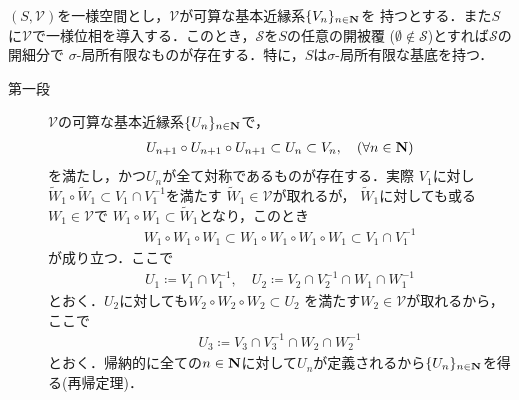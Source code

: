 	\begin{screen}
		\begin{thm}
		\label{thm:if_uniformity_has_countable_base_then_has_topology_has_sigma_locally_finite_base}
			$(S,\mathscr{V})$を一様空間とし，$\mathscr{V}$が可算な基本近縁系$\{V_n\}_{n \in \mathbf{N}}$を
			持つとする．また$S$に$\mathscr{V}$で一様位相を導入する．このとき，$\mathscr{S}$を$S$の任意の開被覆
			($\emptyset \notin \mathscr{S}$)とすれば$\mathscr{S}$の開細分で
			$\sigma$-局所有限なものが存在する．特に，$S$は$\sigma$-局所有限な基底を持つ．
		\end{thm}
	\end{screen}
	
	\begin{prf}\mbox{}
		\begin{description}
			\item[第一段] $\mathscr{V}$の可算な基本近縁系$\{U_n\}_{n \in \mathbf{N}}$で，
				\begin{align}
					U_{n+1} \circ U_{n+1} \circ U_{n+1} \subset U_n
					\subset V_n,\quad (\forall n \in \mathbf{N})
				\end{align}
				を満たし，かつ$U_n$が全て対称であるものが存在する．実際
				$V_1$に対し$\tilde{W}_1 \circ \tilde{W}_1 \subset V_1 \cap V_1^{-1}$を満たす
				$\tilde{W}_1 \in \mathscr{V}$が取れるが，
				$\tilde{W}_1$に対しても或る$W_1 \in \mathscr{V}$で
				$W_1 \circ W_1 \subset \tilde{W}_1$となり，このとき
				\begin{align}
					W_1 \circ W_1 \circ W_1
					\subset W_1 \circ W_1 \circ W_1 \circ W_1
					\subset V_1 \cap V_1^{-1}
				\end{align}
				が成り立つ．ここで
				\begin{align}
					U_1 \coloneqq V_1 \cap V_1^{-1},
					\quad U_2 \coloneqq V_2 \cap V_2^{-1} \cap W_1 \cap W_1^{-1}
				\end{align}
				とおく．$U_2$に対しても$W_2 \circ W_2 \circ W_2 \subset U_2$
				を満たす$W_2 \in \mathscr{V}$が取れるから，ここで
				\begin{align}
					U_3 \coloneqq V_3 \cap V_3^{-1} \cap W_2 \cap W_2^{-1}
				\end{align}
				とおく．帰納的に全ての$n \in \mathbf{N}$に対して$U_n$が定義されるから$\{U_n\}_{n \in \mathbf{N}}$を得る(再帰定理)．
				

\end{description}
\end{prf}
